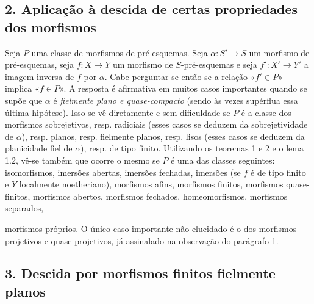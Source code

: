 \documentclass[11pt,twoside,openany]{book}
\numberwithin{equation}{section}
\newcommand{\src}[1]{%
  \phantomsection\hypertarget{src:#1}{}%
  \marginpar{\raggedleft\footnotesize\sffamily #1}%
}
\theoremstyle{plain}
\theoremstyle{definition}
\theoremstyle{remark}
\newcommand{\FgaUnitKey}{frontmatter}
\renewcommand{\src}[1]{%
  \phantomsection\hypertarget{src:\FgaUnitKey:#1}{}%
  \marginpar{\raggedleft\footnotesize\sffamily #1}%
}
\begin{document}
\subsection*{2. Aplicação à descida de certas propriedades dos morfismos}

Seja $P$ uma classe de morfismos de pré-esquemas. Seja
$\alpha:S'\longrightarrow S$ um morfismo de pré-esquemas, seja
$f:X\longrightarrow Y$ um morfismo de $S$-pré-esquemas e seja
$f':X'\longrightarrow Y'$ a imagem inversa de $f$ por $\alpha$. Cabe
perguntar-se então se a relação «$f'\in P$» implica «$f\in P$». A resposta é
afirmativa em muitos casos importantes quando se supõe que $\alpha$ é
\emph{fielmente plano e quase-compacto} (sendo às vezes supérflua essa última
hipótese). Isso se vê diretamente e sem dificuldade se $P$ é a classe dos
morfismos sobrejetivos, resp. radiciais (esses casos se deduzem da
sobrejetividade de $\alpha$), resp. planos, resp. fielmente planos, resp. lisos
(esses casos se deduzem da planicidade fiel de $\alpha$), resp. de tipo finito.
Utilizando os teoremas 1 e 2 e o lema 1.2, vê-se também que ocorre o mesmo se
$P$ é uma das classes seguintes: isomorfismos, imersões abertas, imersões
fechadas, imersões (se $f$ é de tipo finito e $Y$
localmente noetheriano), morfismos afins, morfismos finitos, morfismos
quase-finitos, morfismos abertos, morfismos fechados, homeomorfismos, morfismos
separados,

\src{319}
morfismos próprios. O único caso importante não elucidado é o dos
morfismos projetivos e quase-projetivos, já assinalado na observação do
parágrafo 1.

\subsection*{3. Descida por morfismos finitos fielmente planos}
\end{document}
